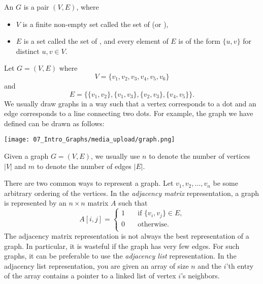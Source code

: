 \begin{flex}
\label{grp:definition:Undirected-graph}

\begin{definition}
\label{definition:Undirected-graph}
An  $G$ is a pair $(V,E)$, where 
\begin{itemize}
    \item $V$ is a finite non-empty set called the set of  (or ),
    \item $E$ is a set called the set of , and every element of $E$ is of the form $\{u,v\}$ for distinct $u, v \in V$.
\end{itemize}

\end{definition}

\begin{example}
\label{example:A-graph-with-6-vertices-and-4-edges}
Let $G=(V,E)$ where $$V = \{v_1,v_2,v_3,v_4,v_5,v_6\}$$ and $$E = \{\{v_1,v_2\},\{v_1,v_3\},\{v_2,v_3\},\{v_4,v_5\}\}.$$ We usually draw graphs in a way such that a vertex corresponds to a dot and an edge corresponds to a line connecting two dots. For example, the graph we have defined can be drawn as follows:
\begin{center}
    \texttt{[image: 07\_Intro\_Graphs/media\_upload/graph.png]}
\end{center} 

\end{example}
\end{flex}

\begin{note}[$n$ and $m$]
\label{note:n-and-m}
Given a graph $G=(V,E)$, we usually use $n$ to denote the number of vertices $|V|$ and $m$ to denote the number of edges $|E|$.

\end{note}

\begin{important}
\label{important:Representations-of-graphs}
There are two common ways to represent a graph. Let $v_1,v_2,\ldots,v_n$ be some arbitrary ordering of the vertices. In the \emph{adjacency matrix} representation, a graph is represented by an $n \times n$ matrix $A$ such that
\[ A[i,j] =
  \begin{cases}
    1  & \quad \text{if $\{v_i,v_j\} \in E$,}\\
    0  & \quad \text{otherwise.}\\
  \end{cases}
\]
The adjacency matrix representation is not always the best representation of a graph. In particular, it is wasteful if the graph has very few edges. For such graphs, it can be preferable to use the \emph{adjacency list} representation. In the adjacency list representation, you are given an array of size $n$ and the $i$'th entry of the array contains a pointer to a linked list of vertex $i$'s neighbors.

\end{important}

